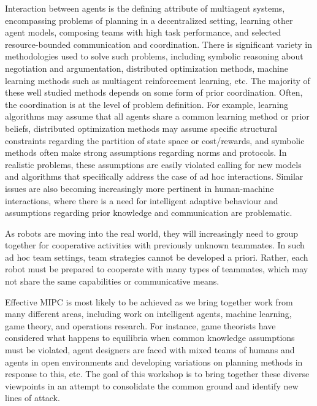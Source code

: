 Interaction between agents is the defining attribute of multiagent systems, encompassing problems of planning in a decentralized setting, learning other agent models, composing teams with high task performance, and selected resource-bounded communication and coordination. There is significant variety in methodologies used to solve such problems, including symbolic reasoning about negotiation and argumentation, distributed optimization methods, machine learning methods such as multiagent reinforcement learning, etc. The majority of these well studied methods depends on some form of prior coordination. Often, the coordination is at the level of problem definition. For example, learning algorithms may assume that all agents share a common learning method or prior beliefs, distributed optimization methods may assume specific structural constraints regarding the partition of state space or cost/rewards, and symbolic methods often make strong assumptions regarding norms and protocols. In realistic problems, these assumptions are easily violated calling for new models and algorithms that specifically address the case of ad hoc interactions. Similar issues are also becoming increasingly more pertinent in human-machine interactions, where there is a need for intelligent adaptive behaviour and assumptions regarding prior knowledge and communication are problematic.

As robots are moving into the real world, they will increasingly need to group together for cooperative activities with previously unknown teammates. In such ad hoc team settings, team strategies cannot be developed a priori. Rather, each robot must be prepared to cooperate with many types of teammates, which may not share the same capabilities or communicative means. 

Effective MIPC is most likely to be achieved as we bring together work from many different areas, including work on intelligent agents, machine learning, game theory, and operations research. For instance, game theorists have considered what happens to equilibria when common knowledge assumptions must be violated, agent designers are faced with mixed teams of humans and agents in open environments and developing variations on planning methods in response to this, etc. The goal of this workshop is to bring together these diverse viewpoints in an attempt to consolidate the common ground and identify new lines of attack.


